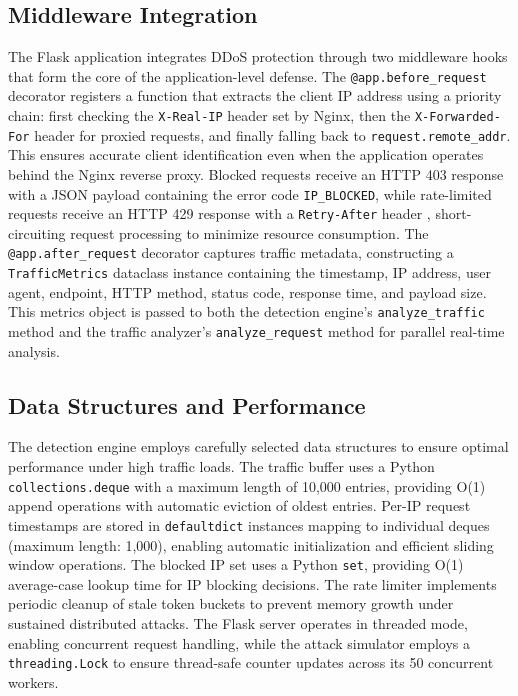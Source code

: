 \documentclass[conference]{IEEEtran}
\begin{document}
\subsection{Middleware Integration}

The Flask application integrates DDoS protection through two middleware hooks that form the core of the application-level defense. The \texttt{@app.before\_request} decorator registers a function that extracts the client IP address using a priority chain: first checking the \texttt{X-Real-IP} header set by Nginx, then the \texttt{X-Forwarded-For} header for proxied requests, and finally falling back to \texttt{request.remote\_addr}. This ensures accurate client identification even when the application operates behind the Nginx reverse proxy. Blocked requests receive an HTTP 403 response with a JSON payload containing the error code \texttt{IP\_BLOCKED}, while rate-limited requests receive an HTTP 429 response with a \texttt{Retry-After} header \cite{b21}, short-circuiting request processing to minimize resource consumption. The \texttt{@app.after\_request} decorator captures traffic metadata, constructing a \texttt{TrafficMetrics} dataclass instance containing the timestamp, IP address, user agent, endpoint, HTTP method, status code, response time, and payload size. This metrics object is passed to both the detection engine's \texttt{analyze\_traffic} method and the traffic analyzer's \texttt{analyze\_request} method for parallel real-time analysis.

\subsection{Data Structures and Performance}

The detection engine employs carefully selected data structures to ensure optimal performance under high traffic loads. The traffic buffer uses a Python \texttt{collections.deque} with a maximum length of 10,000 entries, providing O(1) append operations with automatic eviction of oldest entries. Per-IP request timestamps are stored in \texttt{defaultdict} instances mapping to individual deques (maximum length: 1,000), enabling automatic initialization and efficient sliding window operations. The blocked IP set uses a Python \texttt{set}, providing O(1) average-case lookup time for IP blocking decisions. The rate limiter implements periodic cleanup of stale token buckets to prevent memory growth under sustained distributed attacks. The Flask server operates in threaded mode, enabling concurrent request handling, while the attack simulator employs a \texttt{threading.Lock} to ensure thread-safe counter updates across its 50 concurrent workers.
\end{document}
